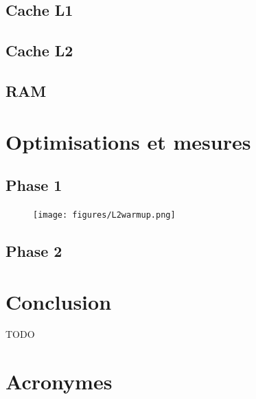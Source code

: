 \documentclass[12pt,a4paper]{article}
\begin{document}
\subsection{Cache L1}
\subsection{Cache L2}
\subsection{RAM}



\section{Optimisations et mesures}

\subsection{Phase 1}

\begin{figure}
    \texttt{[image: figures/L2warmup.png]}
\end{figure}


\subsection{Phase 2}

\section{Conclusion}

TODO


\newpage
\section*{Acronymes}

\begin{acronym}
\end{acronym}
\end{document}
